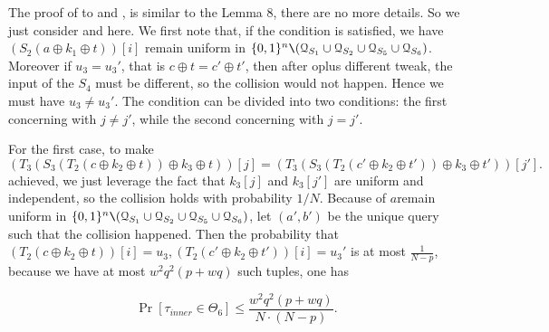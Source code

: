 The proof of \hone to \hfive and \hseven , \height is similar to the Lemma 8, there are no more details. So we just consider \hsix and \hnine here. We first note that, if the condition is satisfied, we have $\left(S_{2}\left(a \oplus k_{1} \oplus t\right)\right)[i]$ remain uniform in $\{0, 1\}^{n} \verb|\| (\mathcal{Q}_{S_{1}} \cup \mathcal{Q}_{S_{2}} \cup \mathcal{Q}_{S_{5}} \cup \mathcal{Q}_{S_{6}})$.  Moreover if $u_3 =u_3'$, that is $c \oplus t=c' \oplus t'$, then after oplus different tweak, the input of the $S_4$ must be different, so the collision would not happen. Hence we must have $u_3 \neq u_3'$. The condition can be divided into two conditions: the first concerning with $j\neq j'$, while the second concerning with $j=j'$.

For the first case, to make 
$$
  \left(T_{3}\left(S_{3}\left(T_2\left(c \oplus k_{2} \oplus t\right)\right) \oplus k_{3} \oplus t\right)\right)[j] = \left(T_{3}\left(S_{3}\left(T_2\left(c' \oplus k_{2} \oplus t'\right)\right) \oplus k_{3} \oplus t'\right)\right)[j'].
$$
\noindent achieved, we just leverage the fact that $k_3[j]$ and $k_3[j']$ are uniform and independent, so the collision holds with probability $1/N$. Because of $a$remain uniform in $\{0, 1\}^{n} \verb|\| (\mathcal{Q}_{S_{1}} \cup \mathcal{Q}_{S_{2}} \cup \mathcal{Q}_{S_{5}} \cup\mathcal{Q}_{S_{6}})$, let $(a', b')$ be the unique query such that the collision happened. Then the probability that $\left(T_2\left(c \oplus k_{2} \oplus t\right)\right)[i] = u_3, \left(T_2\left(c' \oplus k_{2} \oplus t'\right)\right)[i] = u_3'$ is at most $\frac{1}{N-p}$, because we have at most $w^2 q^2(p+ w q)$ such tuples, one has

$$
\operatorname{Pr}\left[\tau_{inner} \in \Theta_{6}\right] \leq \frac{w^{2} q^{2} (p+w q)}{N \cdot (N-p)}.
$$

